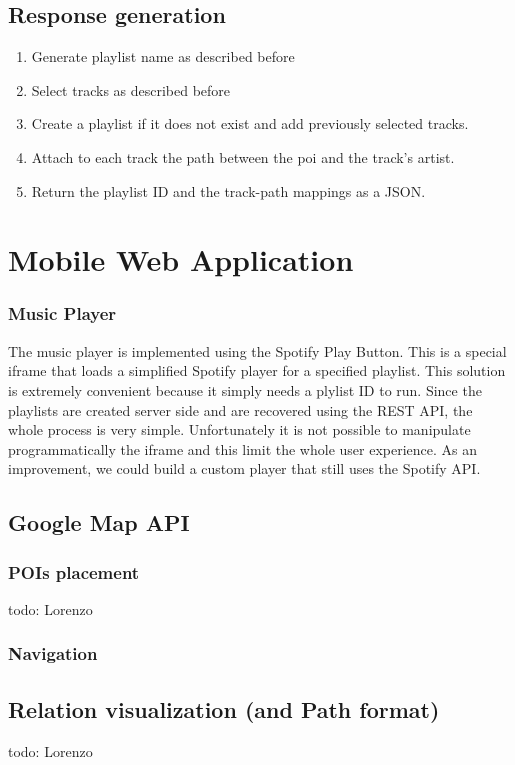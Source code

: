 \subsection{Response generation}
\begin{enumerate}
\item Generate playlist name as described before
\item Select tracks as described before
\item Create a playlist if it does not exist and add previously selected tracks.
\item Attach to each track the path between the poi and the track's artist.
\item Return the playlist ID and the track-path mappings as a JSON.
\end{enumerate}

\section{Mobile Web Application}
\subsubsection{Music Player}
The music player is implemented using the Spotify Play Button. This is a special iframe that loads a simplified Spotify player for a specified playlist. This solution is extremely convenient because it simply needs a plylist ID to run. Since the playlists are created server side and are recovered using the REST API, the whole process is very simple.
Unfortunately it is not possible to manipulate programmatically the iframe and this limit the whole user experience. As an improvement, we could build a custom player that still uses the Spotify API.
\subsection{Google Map API}
\subsubsection{POIs placement}
todo: Lorenzo

\subsubsection{Navigation}

\subsection{Relation visualization (and Path format)}
todo: Lorenzo
